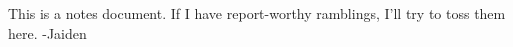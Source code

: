 \documentclass[12pt,journal,compsoc]{IEEEtran}
\begin{document}
This is a notes document. If I have report-worthy ramblings, I'll try to toss them here. -Jaiden
\end{document}

